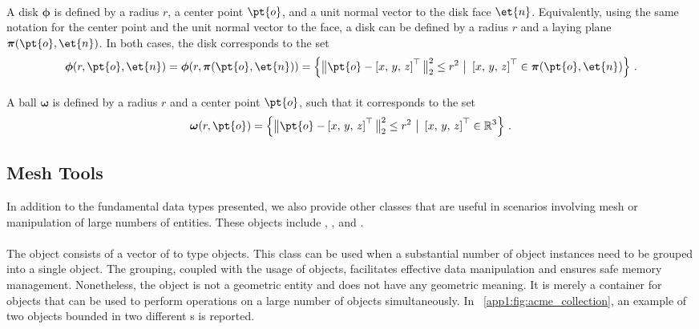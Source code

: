 \paragraph{\Disk{}}
A disk $\boldsymbol{\phi}$ is defined by a radius $r$, a center point $\pt{o}$, and a unit normal vector to the disk face $\et{n}$. Equivalently, using the same notation for the center point and the unit normal vector to the face, a disk can be defined by a radius $r$ and a laying plane $\boldsymbol{\pi}(\pt{o}, \et{n})$. In both cases, the disk corresponds to the set
%
\begin{equation*}
  \boldsymbol{\phi}(r, \pt{o}, \et{n}) = \boldsymbol{\phi}(r, \boldsymbol{\pi}(\pt{o}, \et{n})) = \left\{ \big\| \pt{o} - \left[x, \, y, \, z\right]^{\top} \big\|^2_2 \le r^2 ~ \big| ~ \left[x, \, y, \, z\right]^{\top} \in \boldsymbol{\pi}(\pt{o}, \et{n}) \right\} \, \text{.}
\end{equation*}

\paragraph{\Ball{}}
A ball $\boldsymbol{\omega}$ is defined by a radius $r$ and a center point $\pt{o}$, such that it corresponds to the set
%
\begin{equation*}
  \boldsymbol{\omega}(r, \pt{o}) = \left\{ \big\| \pt{o} - \left[x, \, y, \, z\right]^{\top} \big\|^2_2 \le r^2 ~ \big| ~\left[x, \, y, \, z\right]^{\top} \in \mathbb{R}^3 \right\} \, \text{.}
\end{equation*}

\subsection{Mesh Tools}
In addition to the fundamental data types presented, we also provide other classes that are useful in scenarios involving mesh or manipulation of large numbers of entities. These objects include \Collection{}, \Aabb{}, and \AabbTree{}.

\paragraph{\Collection{}}
The \Collection{} object consists of a vector of \SharedPointer{} to \Entity{} type objects. This class can be used when a substantial number of \Entity{} object instances need to be grouped into a single object. The grouping, coupled with the usage of \SharedPointer{} objects, facilitates effective data manipulation and ensures safe memory management. Nonetheless, the \Collection{} object is not a geometric entity and does not have any geometric meaning. It is merely a container for \Entity{} objects that can be used to perform operations on a large number of \Entity{} objects simultaneously. In \figurename{}~\ref{app1:fig:acme_collection}, an example of two \Collection{} objects bounded in two different \Aabb{}s is reported.

